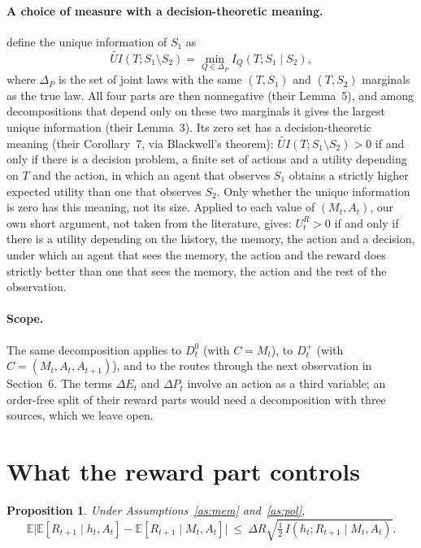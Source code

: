 \documentclass{article}
\newtheorem{proposition}{Proposition}
\theoremstyle{definition}
\theoremstyle{remark}
\newcommand{\E}{\mathbb{E}}
\newcommand{\dE}{\Delta E}
\newcommand{\dP}{\Delta P}
\begin{document}
\paragraph{A choice of measure with a decision-theoretic meaning.}
\citet{bertschinger2014quantifying} define the unique information of $S_1$ as
\[
\widetilde{UI}(T;S_1\setminus S_2)=\min_{Q\in\Delta_P}I_Q(T;S_1\mid S_2),
\]
where $\Delta_P$ is the set of joint laws with the same $(T,S_1)$ and $(T,S_2)$ marginals as the true law. All four parts are then nonnegative (their Lemma~5), and among decompositions that depend only on these two marginals it gives the largest unique information (their Lemma~3). Its zero set has a decision-theoretic meaning (their Corollary~7, via Blackwell's theorem): $\widetilde{UI}(T;S_1\setminus S_2)>0$ if and only if there is a decision problem, a finite set of actions and a utility depending on $T$ and the action, in which an agent that observes $S_1$ obtains a strictly higher expected utility than one that observes $S_2$. Only whether the unique information is zero has this meaning, not its size. Applied to each value of $(M_t,A_t)$, our own short argument, not taken from the literature, gives: $U^R_t>0$ if and only if there is a utility depending on the history, the memory, the action and a decision, under which an agent that sees the memory, the action and the reward does strictly better than one that sees the memory, the action and the rest of the observation.

\paragraph{Scope.} The same decomposition applies to $D^0_t$ (with $C=M_t$), to $D^+_t$ (with $C=(M_t,A_t,A_{t+1})$), and to the routes through the next observation in Section~6. The terms $\dE_t$ and $\dP_t$ involve an action as a third variable; an order-free split of their reward parts would need a decomposition with three sources, which we leave open.

\section{What the reward part controls}

\begin{proposition}\label{prop:reward-error}
Under Assumptions~\ref{as:mem} and~\ref{as:pol},
\[
\E\Big|\E[R_{t+1}\mid h_t,A_t]-\E[R_{t+1}\mid M_t,A_t]\Big|\ \le\ \Delta R\sqrt{\tfrac12\,I(h_t;R_{t+1}\mid M_t,A_t)} .
\]
\end{proposition}
\end{document}
